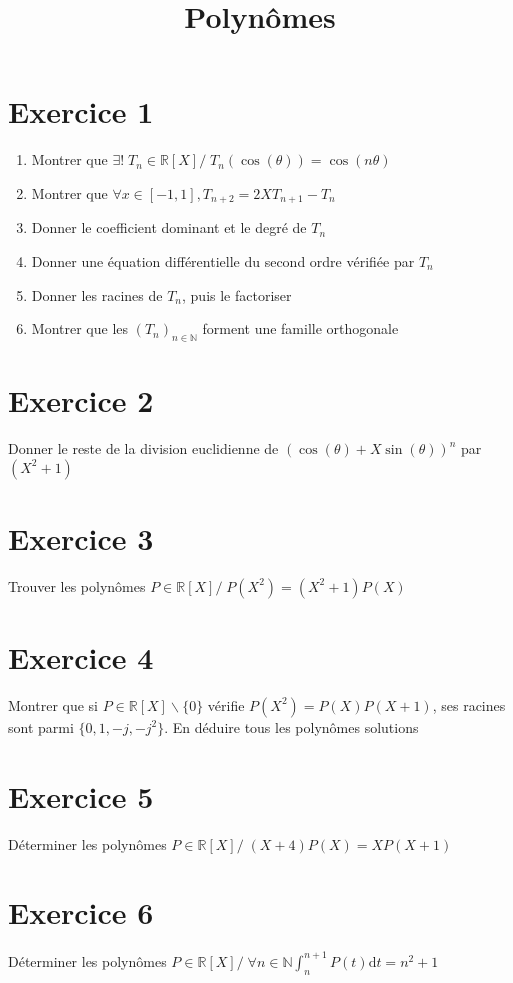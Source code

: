 \documentclass[11pt]{article}
\author{\Name \texttt{\Login}}
\date{}
\title{Polynômes}
\begin{document}
\maketitle

\section*{Exercice 1}

\begin{enumerate}
\item Montrer que $\exists!\; T_n\in\mathbb{R}[X] /\; T_n(\cos(\theta))=\cos(n\theta)$
\item Montrer que $\forall x\in [-1,1], T_{n+2}=2XT_{n+1}-T_n$
\item Donner le coefficient dominant et le degré de $T_n$
\item Donner une équation différentielle du second ordre vérifiée par $T_n$
\item Donner les racines de  $T_n$, puis le factoriser
\item Montrer que les $(T_n)_{n\in\mathbb{N}}$ forment une famille orthogonale
\end{enumerate}

\section*{Exercice 2}

Donner le reste de la division euclidienne de $(\cos(\theta)+X\sin(\theta))^n$ par $(X^2 +1)$

\section*{Exercice 3}

Trouver les polynômes $P\in\mathbb{R}[X]/\; P(X^2)=(X^2+1)P(X)$

\section*{Exercice 4}

Montrer que si $P\in\mathbb{R}[X]\backslash\{0\}$ vérifie $P(X^2)=P(X)P(X+1)$, ses racines sont parmi $\{0,1,-j,-j^2\}$. En déduire tous les polynômes solutions

\section*{Exercice 5}

Déterminer les polynômes $P\in\mathbb{R}[X]/\;(X+4)P(X)=XP(X+1)$

\section*{Exercice 6}

Déterminer les polynômes $P\in\mathbb{R}[X]/\;\forall n\in\mathbb{N} \int_n^{n+1} P(t)\mathrm{d}t = n^2 +1$
\end{document}
